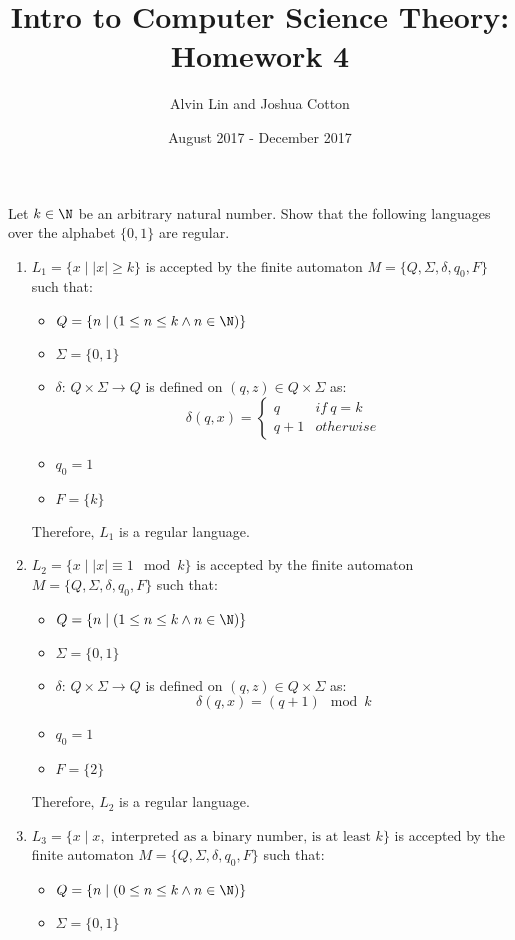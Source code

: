 \documentclass[letterpaper, 12pt]{math}
\title{Intro to Computer Science Theory: Homework 4}
\author{Alvin Lin and Joshua Cotton}
\date{August 2017 - December 2017}
\begin{document}
\maketitle

Let \( k\in\N \) be an arbitrary natural number. Show that the following
languages over the alphabet \( \{0,1\} \) are regular.
\begin{enumerate}
  \item \( L_1 = \{x\mid|x|\ge k\} \) is accepted by the finite automaton
  \( M = \{Q,\Sigma,\delta,q_0,F\} \) such that:
  \begin{itemize}
    \item \( Q = \{n\mid(1\le n\le k \wedge n\in\N)\} \)
    \item \( \Sigma = \{0,1\} \)
    \item \( \delta \): \( Q\times\Sigma\to Q \) is defined on \( (q,z)\in
    Q\times\Sigma \) as:
    \[ \delta(q,x) = \begin{cases}
      q & if\ q = k \\
      q+1 & otherwise
    \end{cases} \]
    \item \( q_0 = 1 \)
    \item \( F = \{k\} \)
  \end{itemize}
  Therefore, \( L_1 \) is a regular language.
  \item \( L_2 = \{x\mid|x|\equiv1\mod k\} \) is accepted by the finite
  automaton \( M = \{Q,\Sigma,\delta,q_0,F\} \) such that:
  \begin{itemize}
    \item \( Q = \{n\mid(1\le n\le k \wedge n\in\N)\} \)
    \item \( \Sigma = \{0,1\} \)
    \item \( \delta \): \( Q\times\Sigma\to Q \) is defined on \( (q,z)\in
    Q\times\Sigma \) as:
    \[ \delta(q,x) = (q+1)\mod k \]
    \item \( q_0 = 1 \)
    \item \( F = \{2\} \)
  \end{itemize}
  Therefore, \( L_2 \) is a regular language.
  \item \( L_3 = \{x\mid x,\text{ interpreted as a binary number, is at least
  } k\} \) is accepted by the finite automaton \( M = \{Q,\Sigma,\delta,q_0,F\}
  \) such that:
  \begin{itemize}
    \item \( Q = \{n\mid(0\le n\le k \wedge n\in\N)\} \)
    \item \( \Sigma = \{0,1\} \)

\end{itemize}
\end{enumerate}
\end{document}
